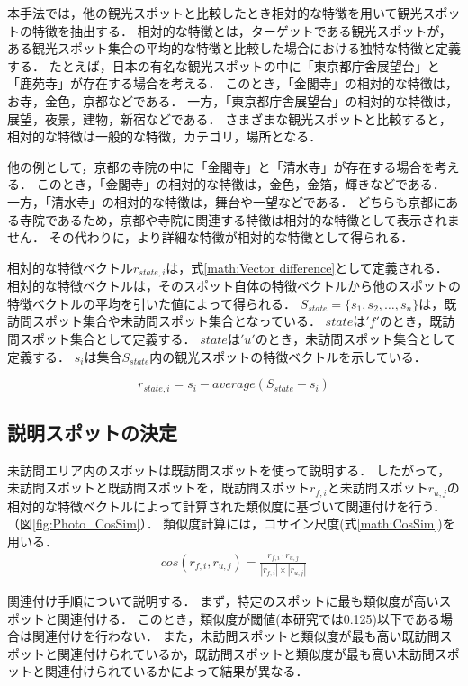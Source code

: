 \documentclass{deimj}
\begin{document}
本手法では，他の観光スポットと比較したとき相対的な特徴を用いて観光スポットの特徴を抽出する．
相対的な特徴とは，ターゲットである観光スポットが，ある観光スポット集合の平均的な特徴と比較した場合における独特な特徴と定義する．
たとえば，日本の有名な観光スポットの中に「東京都庁舎展望台」と「鹿苑寺」が存在する場合を考える．
このとき，「金閣寺」の相対的な特徴は，お寺，金色，京都などである．
一方，「東京都庁舎展望台」の相対的な特徴は，展望，夜景，建物，新宿などである．
さまざまな観光スポットと比較すると，相対的な特徴は一般的な特徴，カテゴリ，場所となる．

他の例として，京都の寺院の中に「金閣寺」と「清水寺」が存在する場合を考える．
このとき，「金閣寺」の相対的な特徴は，金色，金箔，輝きなどである．
一方，「清水寺」の相対的な特徴は，舞台や一望などである．
どちらも京都にある寺院であるため，京都や寺院に関連する特徴は相対的な特徴として表示されません．
その代わりに，より詳細な特徴が相対的な特徴として得られる．

相対的な特徴ベクトル$r_{state,i}$は，式\ref{math:Vector difference}として定義される．
相対的な特徴ベクトルは，そのスポット自体の特徴ベクトルから他のスポットの特徴ベクトルの平均を引いた値によって得られる．
$S_{state} =\{s_1,s_2,\dots,s_n\}$は，既訪問スポット集合や未訪問スポット集合となっている．
$state$は$'f'$のとき，既訪問スポット集合として定義する．
$state$は$'u'$のとき，未訪問スポット集合として定義する．
$s_i$は集合$S_{state}$内の観光スポットの特徴ベクトルを示している．

\begin{equation}
  r_{state,i}=s_i-average(S_{state}-s_i)
  \label{math:Vector difference}
\end{equation}

\subsection{説明スポットの決定}
\label{subsec:説明スポットの決定}
未訪問エリア内のスポットは既訪問スポットを使って説明する．
したがって，未訪問スポットと既訪問スポットを，既訪問スポット$r_{f,i}$と未訪問スポット$r_{u,j}$の相対的な特徴ベクトルによって計算された類似度に基づいて関連付けを行う．（図\ref{fig:Photo_CosSim}）．
類似度計算には，コサイン尺度(式\ref{math:CosSim})を用いる．
\begin{eqnarray}
  cos(r_{f,i},r_{u,j})=\frac{r_{f,i} \cdot r_{u,j}}{|r_{f,i}| \times |r_{u,j}|}
  \label{math:CosSim}
\end{eqnarray}

関連付け手順について説明する．
まず，特定のスポットに最も類似度が高いスポットと関連付ける．
このとき，類似度が閾値(本研究では0.125)以下である場合は関連付けを行わない．
また，未訪問スポットと類似度が最も高い既訪問スポットと関連付けられているか，既訪問スポットと類似度が最も高い未訪問スポットと関連付けられているかによって結果が異なる．
\end{document}
